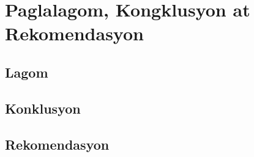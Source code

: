 \documentclass [11pt] {report}
\begin{document}
\chapter{Paglalagom, Kongklusyon at Rekomendasyon}
\section{Lagom}
\section{Konklusyon}
\section{Rekomendasyon}



\end{document}

